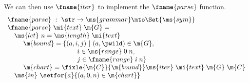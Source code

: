 We can then use $\fname{iter}$ to implement the $\fname{parse}$ function.
\[\begin{array}{l}
\fname{parse} ~:~ \str \uto \ms{grammar} \mto \Set{\ms{sym}}\\
\fname{parse} \;\mi{text} \;\m{G} =\\
\hspace{1em} \ms{let}~ n = \ms{length} \;\mi{text}\\
\hspace{2.375em}\m{bound} =
  \{(a,i,j) ~|~ (a,\pwild) \in \m{G},\\
\hspace{10.5em}i \in \ms{range}\;0\;n, \\
\hspace{10.5em}j\in\fname{range}\;i\;n\}\\
\hspace{2.375em} \m{chart} = \fixle{\m{C}}{\m{bound}}
  \ms{iter} \;\mi{text} \;\m{G} \;\m{C}\\
\hspace{1em}\ms{in}~\setfor{a}{(a, 0, n) \in \m{chart}}\\

\end{array}\]
